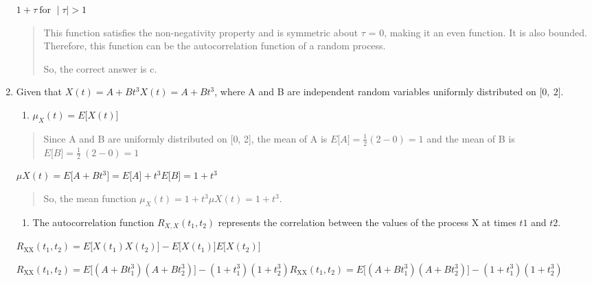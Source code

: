 \documentclass{article}
\begin{document}
\begin{enumerate}
    $1 + \tau\ \text{for~} \mid \tau \mid > 1\ $

    \begin{quote}
    This function satisfies the non-negativity property and is symmetric
    about $\tau$ = 0, making it an even function. It is also bounded. Therefore,
    this function can be the autocorrelation function of a random process.

    So, the correct answer is c.
    \end{quote}

\newpage
\item

    Given that \(X(t) = A + Bt^{3}X(t) = A + Bt^{3}\), where A and B are
    independent random variables uniformly distributed on
    \(\lbrack 0,\ 2\rbrack.\)

    \begin{enumerate}
    \def\labelenumi{\alph{enumi})}
    \item
    \(\mu_{X}(t) = E\lbrack X(t)\rbrack\)
    \end{enumerate}

    \begin{quote}
    Since A and B are uniformly distributed on {[}0, 2{]}, the mean of A is
    \(E\lbrack A\rbrack = \frac{1}{2}(2 - 0) = 1\) and the mean of B is
    \(E\lbrack B\rbrack = \frac{1}{2}\ (2 - 0) = 1\)
    \end{quote}

    $\mu X(t) = E\lbrack A + Bt^{3}\rbrack = E\lbrack A\rbrack + t^{3}E\lbrack B\rbrack = 1 + t^{3}$

    \begin{quote}
    So, the mean function \(\mu_{X}(t) = 1 + t^{3}\mu X(t) = 1 + t^{3}.\)
    \end{quote}

    \begin{enumerate}
    \def\labelenumi{\alph{enumi})}
    \setcounter{enumi}{1}
    \item
    The autocorrelation function \(R_{X,X}(t_{1},t_{2})\) represents the
    correlation between the values of the process X at times \(t1\) and
    \(t2\)\hspace{0pt}.
    \end{enumerate}

    $R_{\text{XX}}(t_{1},t_{2}) = E\lbrack X(t_{1})X(t_{2})\rbrack - E\lbrack X(t_{1})\rbrack E\lbrack X(t_{2})\rbrack$

    $R_{\text{XX}}(t_{1},t_{2}) = E\lbrack(A + Bt_{1}^{3})(A + Bt_{2}^{3})\rbrack - \left( 1 + t_{1}^{3} \right)\left( 1 + t_{2}^{3} \right)R_{\text{XX}}(t_{1},t_{2}) = E\lbrack(A + Bt_{1}^{3})(A + Bt_{2}^{3})\rbrack - (1 + t_{1}^{3})(1 + t_{2}^{3})$


\end{enumerate}
\end{document}
